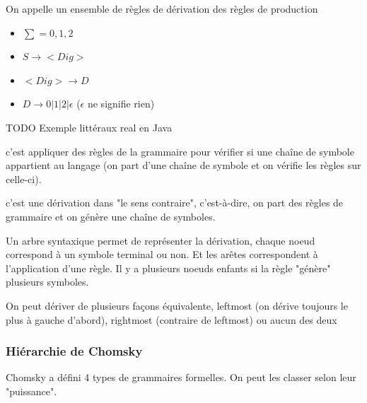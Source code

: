 \begin{mydef}
	On appelle un ensemble de règles de dérivation des règles de production
\end{mydef}

\begin{myexem}
	\begin{itemize}
		\item $\sum ={0,1,2}$ 
		\item $S \rightarrow <Dig>$
		\item $<Dig> \rightarrow D$
		\item $D \rightarrow 0 | 1 |2 | \epsilon $ ($\epsilon$ ne signifie rien)
	\end{itemize}
\end{myexem}
TODO Exemple littéraux real en Java

\begin{mydef}[Dériver] c'est appliquer des règles de la grammaire pour vérifier 
	si une chaîne de symbole appartient au langage (on part d'une chaîne de symbole 
	et on vérifie les règles sur celle-ci).
\end{mydef}

\begin{mydef}[Inférer] c'est une dérivation dans "le sens contraire", 
	c'est-à-dire, on part des règles de grammaire et on génère une chaîne 
	de symboles.
\end{mydef}

\begin{mydef}
	Un arbre syntaxique permet de représenter la dérivation, chaque noeud 
	correspond à un symbole terminal ou non. Et les arêtes correspondent à 
	l'application d'une règle. Il y a plusieurs noeuds enfants si la règle 
	"génère" plusieurs symboles.
\end{mydef}

\begin{myprop}
	On peut dériver de plusieurs façons équivalente, leftmost (on dérive 
	toujours le plus à gauche d'abord), rightmost (contraire de leftmost) 
	ou  aucun des deux
\end{myprop}

\subsubsection{Hiérarchie de Chomsky}
\label{ssub:hi_rarchie_de_chomsky}

Chomsky a défini 4 types de grammaires formelles. On peut les classer selon 
leur "puissance".

